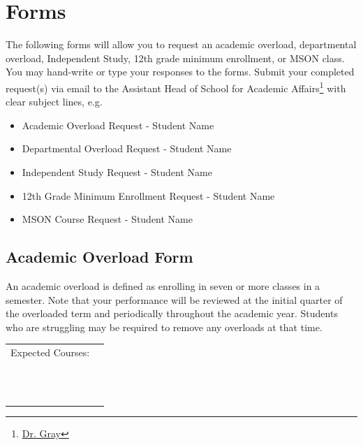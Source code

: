 \newpage
\section{Forms}

The following forms will allow you to request an academic overload, departmental overload, Independent Study, 12th grade minimum enrollment, or MSON class.  You may hand-write or type your responses to the forms.  Submit your completed request(s) via email to the Assistant Head of School for Academic Affairs\footnote{\href{mailto:jonathan.gray@indiansprings.org}{Dr. Gray}} with clear subject lines, e.g. 

\begin{itemize}
  \item Academic Overload Request - Student Name
  \item Departmental Overload Request - Student Name  
  \item Independent Study Request - Student Name
  \item 12th Grade Minimum Enrollment Request  - Student Name
  \item MSON Course Request - Student Name
\end{itemize}

\newpage

\subsection{Academic Overload Form}

An academic overload is defined as enrolling in seven or more classes in a semester. Note that your performance will be reviewed at the initial quarter of the overloaded term and periodically throughout the academic year.  Students who are struggling may be required to remove any overloads at that time.  

\vspace{.5cm}


\begin{tabular}{ll}
Expected Courses: & \underline{\hspace{7cm}}\\
&\\
& \underline{\hspace{7cm}}\\
&\\
& \underline{\hspace{7cm}}\\
&\\
& \underline{\hspace{7cm}}\\
&\\
& \underline{\hspace{7cm}}\\
&\\
& \underline{\hspace{7cm}}\\
&\\
& \underline{\hspace{7cm}}
\end{tabular}



